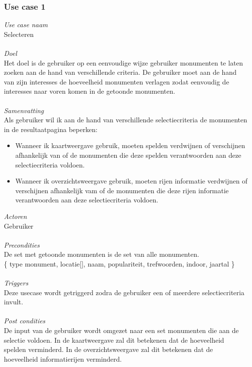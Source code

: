 \documentclass[a4paper,10pt]{article}
\begin{document}
			\subsubsection{Use case 1}
			\textit{Use case naam}\\
			Selecteren\\ \\
			\textit{Doel}\\
			Het doel is de gebruiker op een eenvoudige wijze gebruiker monumenten te laten zoeken aan de hand van verschillende criteria. De gebruiker moet aan de hand van zijn interesses de hoeveelheid monumenten verlagen zodat eenvoudig de interesses naar voren komen in de getoonde monumenten.\\ \\
			\textit{Samenvatting}\\
			Als gebruiker wil ik aan de hand van verschillende selectiecriteria de monumenten in de resultaatpagina beperken:
			\begin{itemize}
				\item Wanneer ik kaartweergave gebruik, moeten spelden verdwijnen of verschijnen afhankelijk van of de monumenten die deze spelden verantwoorden aan deze selectiecriteria voldoen.
				\item Wanneer ik overzichtsweergave gebruik, moeten rijen informatie verdwijnen of verschijnen afhankelijk vam of de monumenten die deze rijen informatie verantwoorden aan deze selectiecriteria voldoen.
			\end{itemize}
			\textit{Actoren}\\
			Gebruiker\\ \\
			\textit{Precondities}\\
			De set met getoonde monumenten is de set van alle monumenten.\\
			\{ type monument, locatie[], naam, populariteit, trefwoorden, indoor, jaartal \} \\ \\
			\textit{Triggers}\\
			Deze usecase wordt getriggerd zodra de gebruiker een of meerdere selectiecriteria invult.\\ \\
			\textit{Post condities}\\			
			De input van de gebruiker wordt omgezet naar een set monumenten die aan de selectie voldoen. In de kaartweergave zal dit betekenen dat de hoeveelheid spelden verminderd. In de overzichtsweergave zal dit betekenen dat de hoeveelheid informatierijen verminderd.		
			
\end{document}
